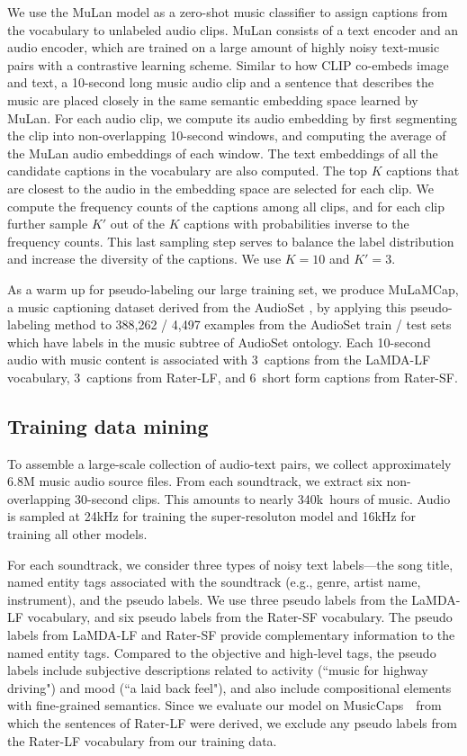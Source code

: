 \documentclass[nohyperref]{article}
\newcommand{\MusicCap}{MuLaMCap}
\newcommand{\EvalSet}{MusicCaps~\cite{musiclm2023}}
\theoremstyle{plain}
\theoremstyle{definition}
\theoremstyle{remark}
\begin{document}
We use the MuLan model as a zero-shot music classifier to assign captions from the vocabulary to unlabeled audio clips.
MuLan consists of a text encoder and an audio encoder, which are trained on a large amount of highly noisy text-music pairs with a contrastive learning scheme. Similar to how CLIP \cite{radford2021learning} co-embeds image and text, a 10-second long music audio clip and a sentence that describes the music are placed closely in the same semantic embedding space learned by MuLan.
For each audio clip, we compute its audio embedding by first segmenting the clip into non-overlapping 10-second windows, and computing the average of the MuLan audio embeddings of each window. The text embeddings of all the candidate captions in the vocabulary are also computed. The top $K$ captions that are closest to the audio in the embedding space are selected for each clip.  
We compute the frequency counts of the captions among all clips, and for each clip further sample $K'$ out of the $K$ captions with probabilities inverse to the frequency counts.
This last sampling step serves to balance the label distribution and increase the diversity of the captions. We use $K=10$ and $K'=3$.

As a warm up for pseudo-labeling our large training set, we produce \MusicCap, a music captioning dataset derived from the AudioSet \cite{gemmeke2017audio}, by applying this pseudo-labeling method to 388,262 / 4,497 examples from the AudioSet train / test sets which have labels in the music subtree of AudioSet ontology. Each 10-second audio with music content is associated with 3~captions from the LaMDA-LF vocabulary, 3~captions from Rater-LF, and 6~short form captions from Rater-SF. 


\subsection{Training data mining}
To assemble a large-scale collection of audio-text pairs, we collect approximately 6.8M {music audio source files.}
From each {soundtrack}, we extract six non-overlapping 30-second clips. This amounts to nearly 340k~hours of music. Audio is sampled at 24kHz for training the super-resoluton model and 16kHz for training all other models.

For each {soundtrack}, we consider three types of noisy text labels---the song title, named entity tags associated with the {soundtrack} (e.g., genre, artist name, instrument), and the pseudo labels. We use three pseudo labels from the LaMDA-LF vocabulary, and six pseudo labels from the Rater-SF vocabulary.
The pseudo labels from LaMDA-LF and Rater-SF provide complementary information to the named entity tags. Compared to the objective and high-level tags, the pseudo labels include subjective descriptions related to activity (``music for highway driving") and mood (``a laid back feel"), and also include compositional elements with fine-grained semantics. 
Since we evaluate our model on \EvalSet~from which the sentences of Rater-LF were derived, we exclude any pseudo labels from the Rater-LF vocabulary from our training data.
\end{document}
